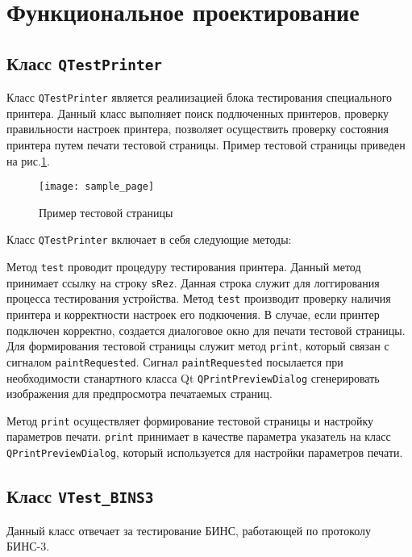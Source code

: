 \section{Функциональное проектирование}
\label{sec:func}

\subsection{Класс \texttt{QTestPrinter}}
Класс \texttt{QTestPrinter} является реалиизацией блока тестирования специального принтера.
Данный класс выполняет поиск подлюченных принтеров, проверку правильности настроек принтера,
позволяет осуществить проверку состояния принтера путем печати тестовой страницы. Пример тестовой страницы приведен на
рис.\ref{fig:func:sample_page}.
\begin{figure}[!htb]
	\centering
	\texttt{[image: sample\_page]}
	\caption{Пример тестовой страницы}
	\label{fig:func:sample_page}
\end{figure}

Класс \texttt{QTestPrinter} включает в себя следующие методы:

\begin{enum}
	\item Метод \texttt{test} проводит процедуру тестирования принтера. Данный метод принимает ссылку на строку
		\texttt{sRez}. Данная строка служит для логгирования процесса тестирования устройства. Метод \texttt{test} производит
		проверку наличия принтера и корректности настроек его подкючения. В случае, если принтер подключен корректно, создается
		диалоговое окно для печати тестовой страницы. Для формирования тестовой страницы служит метод \texttt{print}, который
		связан с сигналом \texttt{paintRequested}. Сигнал \texttt{paintRequested} посылается при необходимости станартного
		класса Qt \texttt{QPrintPreviewDialog} сгенерировать изображения для предпросмотра печатаемых страниц.

	\item Метод \texttt{print} осуществляет формирование тестовой страницы и настройку параметров печати. \texttt{print}
		принимает в качестве параметра указатель на класс \texttt{QPrintPreviewDialog}, который используется для настройки
		параметров печати.
\end{enum}

\subsection{Класс \texttt{VTest\_BINS3}}
Данный класс отвечает за тестирование БИНС, работающей по протоколу БИНС-3.

